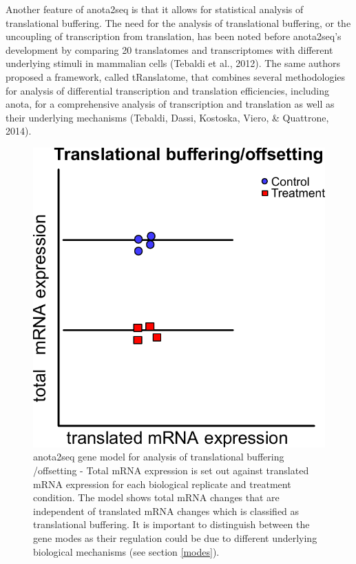 \documentclass[
  12pt,
  openany]{book}
\begin{document}
Another feature of anota2seq is that it allows for statistical analysis of translational buffering. The need for the analysis of translational buffering, or the uncoupling of transcription from translation, has been noted before anota2seq's development by comparing 20 translatomes and transcriptomes with different underlying stimuli in mammalian cells (Tebaldi et al., 2012). The same authors proposed a framework, called tRanslatome, that combines several methodologies for analysis of differential transcription and translation efficiencies, including anota, for a comprehensive analysis of transcription and translation as well as their underlying mechanisms (Tebaldi, Dassi, Kostoska, Viero, \& Quattrone, 2014).

\begin{figure}
  \includegraphics{./figures/geneModes_anota2seq.pdf}
  \caption{anota2seq gene model for analysis of translational buffering /offsetting - Total mRNA expression is set out against translated mRNA expression for each biological replicate and treatment condition. The model shows total mRNA changes that are independent of translated mRNA changes which is classified as translational buffering. It is important to distinguish between the gene modes as their regulation could be due to different underlying biological mechanisms (see section \ref{modes}).
  \label{fig:anota2seq}}
\end{figure}
\end{document}
